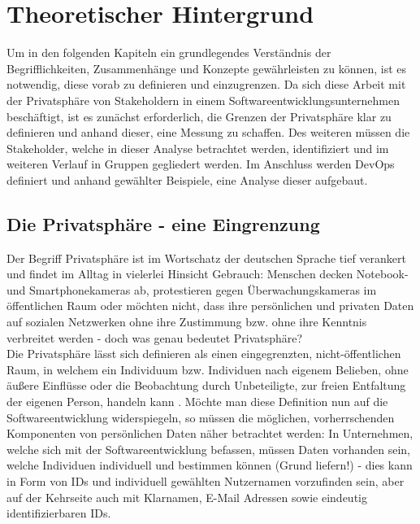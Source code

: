 \chapter{Theoretischer Hintergrund} %
\label{Background} %
Um in den folgenden Kapiteln ein grundlegendes Verständnis der Begrifflichkeiten, Zusammenhänge und Konzepte gewährleisten zu können, ist es notwendig,
diese vorab zu definieren und einzugrenzen. Da sich diese Arbeit mit der Privatsphäre von Stakeholdern in einem Softwareentwicklungsunternehmen beschäftigt,
ist es zunächst erforderlich, die Grenzen der Privatsphäre klar zu definieren und anhand dieser, eine Messung zu schaffen. Des weiteren müssen die Stakeholder,
welche in dieser Analyse betrachtet werden, identifiziert und im weiteren Verlauf in Gruppen gegliedert werden. Im Anschluss werden DevOps definiert und anhand
gewählter Beispiele, eine Analyse dieser aufgebaut.

\section{Die Privatsphäre - eine Eingrenzung}
Der Begriff Privatsphäre ist im Wortschatz der deutschen Sprache tief verankert und findet im Alltag in vielerlei Hinsicht Gebrauch: Menschen decken Notebook- und Smartphonekameras
ab, protestieren gegen Überwachungskameras im öffentlichen Raum \cite{Stallwood:2013aa} oder möchten nicht, dass ihre persönlichen und privaten Daten auf sozialen Netzwerken ohne ihre Zustimmung
bzw. ohne ihre Kenntnis verbreitet werden \cite{Picchi:2018aa} - doch was genau bedeutet Privatsphäre? \\
Die Privatsphäre lässt sich definieren als einen eingegrenzten, nicht-öffentlichen Raum, in welchem ein Individuum bzw. Individuen nach eigenem Belieben, ohne äußere Einflüsse oder die Beobachtung durch
Unbeteiligte, zur freien Entfaltung der eigenen Person, handeln kann \cite*{Pettinger:2020aa}. Möchte man diese Definition nun auf die Softwareentwicklung widerspiegeln, so müssen die möglichen, 
vorherrschenden Komponenten von persönlichen Daten näher betrachtet werden: In Unternehmen, welche sich mit der Softwareentwicklung befassen, müssen Daten vorhanden sein, welche Individuen individuell und 
bestimmen können (Grund liefern!) - dies kann in Form von IDs und individuell gewählten Nutzernamen vorzufinden sein, aber auf der Kehrseite auch mit Klarnamen, E-Mail Adressen sowie eindeutig identifizierbaren IDs. 

